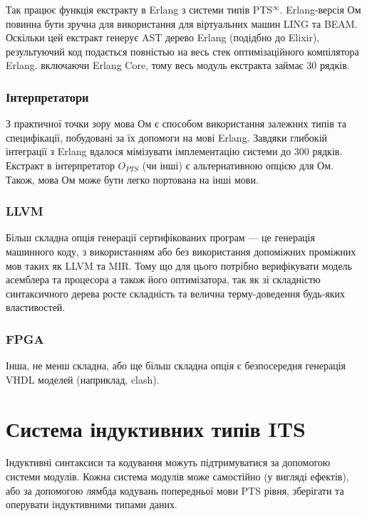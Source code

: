 Так працює функція екстракту в Erlang з системи типів PTS$^\infty$.
Erlang-версія Ом повинна бути зручна для використання для
віртуальних машин LING та BEAM. Оскільки цей екстракт генерує
AST дерево Erlang (подідбно до Elixir), результуючий код
подається повністью на весь стек оптимізаційного компілятора
Erlang. включаючи Erlang Core, тому весь модуль екстракта займає 30 рядків.

\subsubsection{Інтерпретатори}
З практичної точки зору мова Ом є способом використання залежних типів
та специфікації, побудовані за їх допомоги на мові Erlang.
Завдяки глибокій інтеграції з Erlang вдалося мімізувати імплементацію системи до 300 рядків.
Екстракт в інтерпретатор $O_{PTS}$ (чи інші) є альтернативною опцією для Ом.
Також, мова Ом може бути легко портована на інші мови.

\subsubsection{LLVM}
Більш складна опція генерації сертифікованих програм --- це генерація машинного коду,
з використанням або без використання допоміжних проміжних мов таких як LLVM та MIR.
Тому що для цього потрібно верифікувати модель асемблера та процесора а також
його оптимізатора, так як зі складністю синтаксичного дерева росте складність
та велична терму-доведення будь-яких властивостей.

\subsubsection{FPGA}
Інша, не менш складна, або ще більш складна опція є безпосередня генерація
VHDL моделей (наприклад, clash).

\newpage
\section{Система індуктивних типів ITS}
Індуктивні синтаксиси та кодування можуть підтримуватися за допомогою системи модулів.
Кожна система модулів може самостійно (у вигляді ефектів), або за допомогою лямбда кодувань
попередньої мови PTS рівня, зберігати та оперувати індуктивними типами даних.

